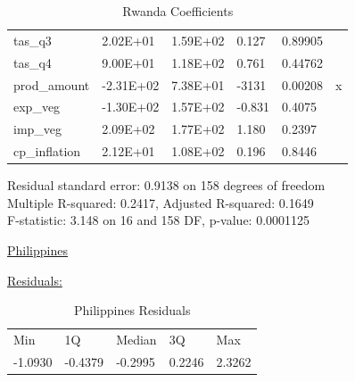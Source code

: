 \documentclass[11pt]{article}
\begin{document}
\begin{table}[!htbp]
\begin{tabular}{llllll}
tas\_q3                & 2.02E+01  & 1.59E+02   & 0.127   & 0.89905             &             \\
tas\_q4                & 9.00E+01  & 1.18E+02   & 0.761   & 0.44762             &             \\
prod\_amount           & -2.31E+02 & 7.38E+01   & -3131   & 0.00208             & x           \\
exp\_veg               & -1.30E+02 & 1.57E+02   & -0.831  & 0.4075              &             \\
imp\_veg               & 2.09E+02  & 1.77E+02   & 1.180   & 0.2397              &             \\
cp\_inflation          & 2.12E+01  & 1.08E+02   & 0.196   & 0.8446              &            \\ \hline
\end{tabular}
\caption{Rwanda Coefficients}
\label{table16}
\end{table}
\FloatBarrier
Residual standard error: 0.9138 on 158 degrees of freedom \\
Multiple R-squared:  0.2417,	Adjusted R-squared:  0.1649 \\
F-statistic: 3.148 on 16 and 158 DF,  p-value: 0.0001125

\newpage
\begin{center}\underline{Philippines} \end{center}
\underline{Residuals:}
\FloatBarrier
\begin{table}[!htbp]
\centering
\begin{tabular}{lllll}
Min     & 1Q      & Median  & 3Q     & Max    \\
-1.0930 & -0.4379 & -0.2995 & 0.2246 & 2.3262
\end{tabular}
\caption{Philippines Residuals}
\label{table17l}
\end{table}
\FloatBarrier
\end{document}

